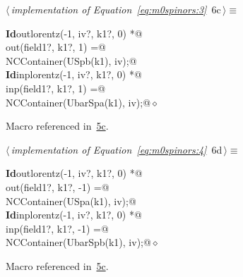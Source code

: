 \documentclass[a4paper,12pt]{amsart}
\renewcommand{\NWtarget}[2]{\hypertarget{#1}{#2}}
\renewcommand{\NWlink}[2]{\hyperlink{#1}{#2}}
\renewcommand{\NWtxtMacroRefIn}{Macro referenced in}
\renewcommand{\NWsep}{${\diamond}$}
\begin{document}
\begin{flushleft} \small
\begin{minipage}{\linewidth}\label{scrap11}\raggedright\small
\NWtarget{nuweb6c}{} $\langle\,${\itshape implementation of Equation~\eqref{eq:m0spinors:3}}\nobreak\ {\footnotesize {6c}}$\,\rangle\equiv$
\vspace{-1ex}
\begin{list}{}{} \item
\mbox{}\verb@@\hbox{\sffamily\bfseries Id}\verb@ outlorentz(-1, iv?, k1?, 0) *@\\
\mbox{}\verb@      out(field1?, k1?,  1) =@\\
\mbox{}\verb@   NCContainer(USpb(k1), iv);@\\
\mbox{}\verb@@\hbox{\sffamily\bfseries Id}\verb@ inplorentz(-1, iv?, k1?, 0) *@\\
\mbox{}\verb@      inp(field1?, k1?,  1) =@\\
\mbox{}\verb@   NCContainer(UbarSpa(k1), iv);@{\NWsep}
\end{list}
\vspace{-1.5ex}
\footnotesize
\begin{list}{}{\setlength{\itemsep}{-\parsep}\setlength{\itemindent}{-\leftmargin}}
\item \NWtxtMacroRefIn\ \NWlink{nuweb5c}{5c}.

\item{}
\end{list}
\end{minipage}\vspace{4ex}
\end{flushleft}
\begin{flushleft} \small
\begin{minipage}{\linewidth}\label{scrap12}\raggedright\small
\NWtarget{nuweb6d}{} $\langle\,${\itshape implementation of Equation~\eqref{eq:m0spinors:4}}\nobreak\ {\footnotesize {6d}}$\,\rangle\equiv$
\vspace{-1ex}
\begin{list}{}{} \item
\mbox{}\verb@@\hbox{\sffamily\bfseries Id}\verb@ outlorentz(-1, iv?, k1?, 0) *@\\
\mbox{}\verb@      out(field1?, k1?, -1) =@\\
\mbox{}\verb@   NCContainer(USpa(k1), iv);@\\
\mbox{}\verb@@\hbox{\sffamily\bfseries Id}\verb@ inplorentz(-1, iv?, k1?, 0) *@\\
\mbox{}\verb@      inp(field1?, k1?, -1) =@\\
\mbox{}\verb@   NCContainer(UbarSpb(k1), iv);@{\NWsep}
\end{list}
\vspace{-1.5ex}
\footnotesize
\begin{list}{}{\setlength{\itemsep}{-\parsep}\setlength{\itemindent}{-\leftmargin}}
\item \NWtxtMacroRefIn\ \NWlink{nuweb5c}{5c}.

\item{}
\end{list}
\end{minipage}\vspace{4ex}
\end{flushleft}
\end{document}
